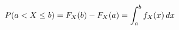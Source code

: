 \documentclass[preview]{standalone}
\begin{document}
\begin{align*}
\special{dvisvgm:raw <g id='unique000'>}P(a<X\leq b)=F_X(b)-F_X(a)=\int_a^b f_X(x)\,dx\special{dvisvgm:raw </g>}
\end{align*}
\end{document}
